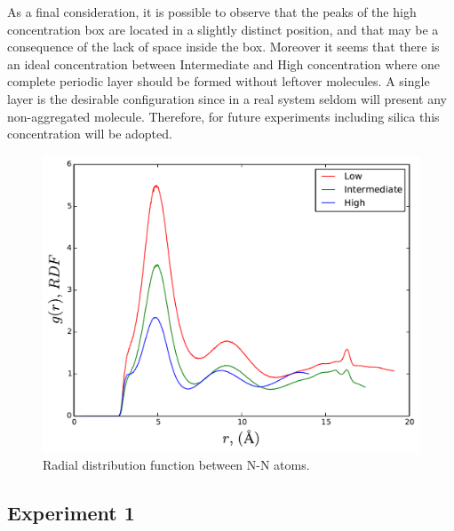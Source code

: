 \documentclass[10pt,a4paper,twoside]{article}
\begin{document}
As a final consideration, it is possible to observe that the peaks of the high concentration box are located in a slightly distinct position, and that may be a consequence of the lack of space inside the box. Moreover it seems that there is an ideal concentration between Intermediate and High concentration where one complete periodic layer should be formed without leftover molecules. A single layer is the desirable configuration since in a real system seldom will present any non-aggregated molecule. Therefore, for future experiments including silica this concentration will be adopted.
\begin{figure}[H]
  \begin{center}
	\includegraphics[width=0.7 \textwidth]{./graphs/rdfAA}
	\caption{Radial distribution function between N-N atoms. }
	\label{Fig:rdfAA}
  \end{center}
\end{figure}
\subsection{Experiment 1}
\end{document}
